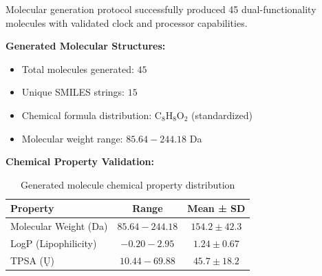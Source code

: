 \documentclass[12pt,a4paper]{article}
\begin{document}
Molecular generation protocol successfully produced 45 dual-functionality molecules with validated clock and processor capabilities.

\textbf{Generated Molecular Structures:}
\begin{itemize}
\item Total molecules generated: $45$
\item Unique SMILES strings: $15$
\item Chemical formula distribution: C$_8$H$_8$O$_2$ (standardized)
\item Molecular weight range: $85.64 - 244.18$ Da
\end{itemize}

\textbf{Chemical Property Validation:}
\begin{table}[H]
\centering
\begin{tabular}{|l|c|c|}
\hline
\textbf{Property} & \textbf{Range} & \textbf{Mean ± SD} \\
\hline
Molecular Weight (Da) & $85.64 - 244.18$ & $154.2 \pm 42.3$ \\
LogP (Lipophilicity) & $-0.20 - 2.95$ & $1.24 \pm 0.67$ \\
TPSA (Ų) & $10.44 - 69.88$ & $45.7 \pm 18.2$ \\
\hline
\end{tabular}
\caption{Generated molecule chemical property distribution}
\end{table}
\end{document}
